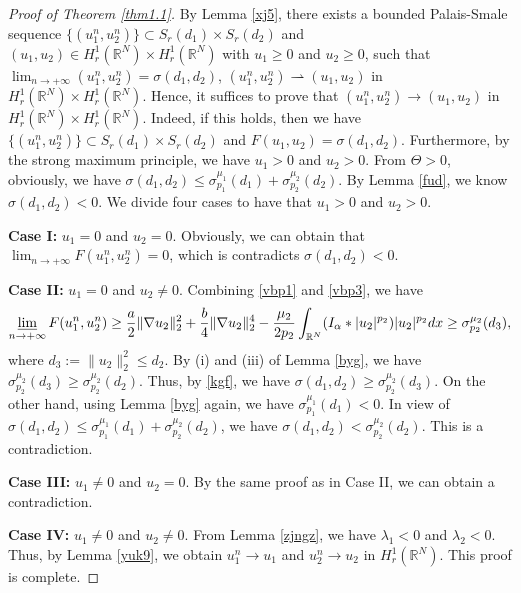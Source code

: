 \documentclass[10pt,a4paper]{amsart}
\numberwithin{equation}{section}
\begin{document}
\begin{proof}[Proof of Theorem \ref{thm1.1}] 
By Lemma \ref{xj5}, there exists a bounded Palais-Smale sequence 
$\{(u_1^n,u_2^n)\}\subset S_{r}(d_1)\times S_{r}(d_2)$
and $(u_1,u_2)\in H_r^1(\mathbb{R}^N)\times H_r^1(\mathbb{R}^N)$ with $u_1\geq0$ 
and $u_2\geq0$, such that $\lim_{n\to +\infty}
(u_1^n,u_2^n)=\sigma(d_1,d_2)$, $(u_1^n,u_2^n)\rightharpoonup(u_1,u_2)$ in 
$H_r^1(\mathbb{R}^N)\times H_r^1(\mathbb{R}^N)$. Hence, it suffices to
prove that $(u_1^n,u_2^n)\to (u_1,u_2)$ in 
$H_r^1(\mathbb{R}^N)\times H_r^1(\mathbb{R}^N)$. Indeed, if this holds, then we have
$\{(u_1^n,u_2^n)\}\subset S_{r}(d_1)\times S_{r}(d_2)$ and 
$F(u_1,u_2)=\sigma(d_1,d_2)$. Furthermore, by the strong maximum principle,
we have $u_1>0$ and $u_2>0$. From $\Theta>0$, obviously, we have 
$\sigma(d_1,d_2)\leq\sigma_{p_1}^{\mu_1}(d_1)+\sigma_{p_2}^{\mu_2}(d_2)$. 
By Lemma \ref{fud}, we know
$\sigma(d_1,d_2)<0$. We divide four cases to have that $u_1>0$ and $u_2>0$.
\smallskip 

\noindent\textbf{Case I:} $u_1=0$ and $u_2=0$.
Obviously, we can obtain that $\lim_{n\to +\infty}F(u_1^n,u_2^n)=0$, which is 
 contradicts $\sigma(d_1,d_2)<0$.
\smallskip

\noindent\textbf{Case II:} $u_1=0$ and $u_2\neq0$.
Combining \eqref{vbp1} and \eqref{vbp3}, we have
\begin{equation}\label{kgf}
\varliminf_{n\to +\infty}F(u_1^n,u_2^n)
\geq\frac{a}{2}\| \nabla u_2\|_2^2+\frac{b}{4}\|
 \nabla u_2\|_2^4-\frac{\mu_2}{2p_2}
 \int_{\mathbb{R}^N}(I_\alpha\ast|u_2|^{p_2})|u_2|^{p_2}dx
\geq \sigma_{p_2}^{\mu_2}(d_3),
\end{equation}
where $d_3:=\| u_2\|_2^2\leq d_2$. By (i) and (iii) of Lemma \ref{byg}, 
we have $\sigma_{p_2}^{\mu_2}(d_3)\geq\sigma_{p_2}^{\mu_2}(d_2)$.
Thus, by \eqref{kgf}, we have $\sigma(d_1,d_2)\geq \sigma_{p_2}^{\mu_2}(d_3)$. 
On the other hand, using Lemma \ref{byg} again, we have $\sigma_{p_1}^{\mu_1}(d_1)<0$. 
In view of $\sigma(d_1,d_2)\leq\sigma_{p_1}^{\mu_1}(d_1)+\sigma_{p_2}^{\mu_2}(d_2)$, 
we have $\sigma(d_1,d_2)<\sigma_{p_2}^{\mu_2}(d_2)$.
This is a contradiction.
\smallskip

\noindent\textbf{Case III:} $u_1\neq0$ and $u_2=0$.
By the same proof as in Case II, we can  obtain a contradiction.
\smallskip

\noindent\textbf{Case IV:} $u_1\neq0$ and $u_2\neq0$.
From Lemma \ref{zjngz}, we have $\lambda_1<0$ and $\lambda_2<0$. Thus, by 
Lemma \ref{yuk9}, we obtain $u_1^n\to  u_1$ and
$u_2^n\to  u_2$ in $H_r^1(\mathbb{R}^N)$. This proof is complete.
\end{proof}
\end{document}
